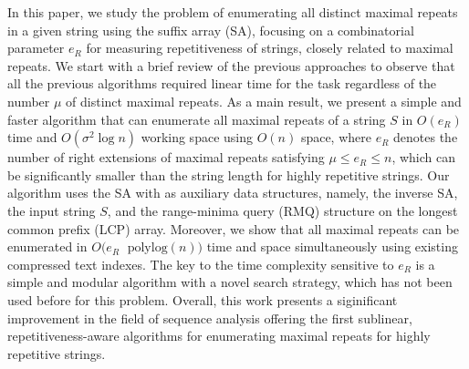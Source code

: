In this paper, we study the problem of enumerating all distinct maximal repeats in a given string using the suffix array (SA), focusing on a combinatorial parameter $e_R$ for measuring repetitiveness of strings, closely related to maximal repeats.  We start with a brief review of the previous approaches to observe that all the previous algorithms required linear time for the task regardless of the number $\mu$ of distinct maximal repeats.
As a main result, we present a simple and faster algorithm that can enumerate all maximal repeats of a string $S$ in $O(e_R)$ time and $O(\sigma^2 \log n)$ working space using $O(n)$ space, where $e_R$ denotes the number of right extensions of maximal repeats satisfying $\mu\le e_R\le n$, which can be significantly smaller than the string length for highly repetitive strings. Our algorithm uses the SA with as auxiliary data structures, namely, the inverse SA, the input string $S$, and the range-minima query (RMQ) structure on the longest common prefix (LCP) array. 
Moreover, we show that all maximal repeats can be enumerated in $O(e_R$ $\;\textrm{polylog}(n))$ time and space simultaneously using existing compressed text indexes. The key to the time complexity sensitive to $e_R$ is a simple and modular algorithm with a novel search strategy, which has not been used before for this problem. 
Overall, this work presents a siginificant improvement in the field of sequence analysis offering the first sublinear, repetitiveness-aware algorithms for enumerating maximal repeats for highly repetitive strings.
